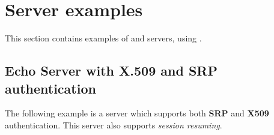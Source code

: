 \documentclass{book}
\begin{document}


\section{Server examples}
This section contains examples of \tls{} and \ssl{} servers, using \gnutls{}.

\subsection{Echo Server with X.509 and SRP authentication}
The following example is a server which supports both {\bf SRP} and {\bf X509} authentication.
This server also supports {\it session resuming}.







\end{document}
